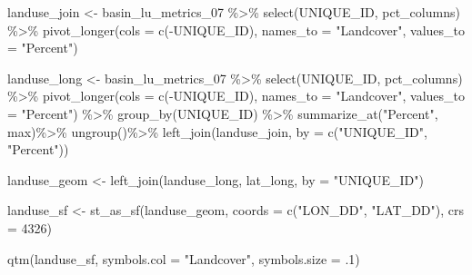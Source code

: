 \documentclass[
]{book}
\newenvironment{Shaded}{\begin{snugshade}}{\end{snugshade}}
\newcommand{\AttributeTok}[1]{\textcolor[rgb]{0.77,0.63,0.00}{#1}}
\newcommand{\DecValTok}[1]{\textcolor[rgb]{0.00,0.00,0.81}{#1}}
\newcommand{\FunctionTok}[1]{\textcolor[rgb]{0.00,0.00,0.00}{#1}}
\newcommand{\NormalTok}[1]{#1}
\newcommand{\OtherTok}[1]{\textcolor[rgb]{0.56,0.35,0.01}{#1}}
\newcommand{\SpecialCharTok}[1]{\textcolor[rgb]{0.00,0.00,0.00}{#1}}
\newcommand{\StringTok}[1]{\textcolor[rgb]{0.31,0.60,0.02}{#1}}
\begin{document}
\begin{Shaded}
\begin{Highlighting}[]
\NormalTok{landuse\_join }\OtherTok{\textless{}{-}}\NormalTok{ basin\_lu\_metrics\_07 }\SpecialCharTok{\%\textgreater{}\%}
  \FunctionTok{select}\NormalTok{(UNIQUE\_ID, pct\_columns) }\SpecialCharTok{\%\textgreater{}\%}
  \FunctionTok{pivot\_longer}\NormalTok{(}\AttributeTok{cols =} \FunctionTok{c}\NormalTok{(}\SpecialCharTok{{-}}\NormalTok{UNIQUE\_ID), }\AttributeTok{names\_to =} \StringTok{"Landcover"}\NormalTok{, }\AttributeTok{values\_to =} \StringTok{"Percent"}\NormalTok{)}



\NormalTok{landuse\_long }\OtherTok{\textless{}{-}}\NormalTok{ basin\_lu\_metrics\_07 }\SpecialCharTok{\%\textgreater{}\%}
  \FunctionTok{select}\NormalTok{(UNIQUE\_ID, pct\_columns) }\SpecialCharTok{\%\textgreater{}\%}
  \FunctionTok{pivot\_longer}\NormalTok{(}\AttributeTok{cols =} \FunctionTok{c}\NormalTok{(}\SpecialCharTok{{-}}\NormalTok{UNIQUE\_ID), }\AttributeTok{names\_to =} \StringTok{"Landcover"}\NormalTok{, }\AttributeTok{values\_to =} \StringTok{"Percent"}\NormalTok{) }\SpecialCharTok{\%\textgreater{}\%}
  \FunctionTok{group\_by}\NormalTok{(UNIQUE\_ID) }\SpecialCharTok{\%\textgreater{}\%}
  \FunctionTok{summarize\_at}\NormalTok{(}\StringTok{"Percent"}\NormalTok{, max)}\SpecialCharTok{\%\textgreater{}\%}
  \FunctionTok{ungroup}\NormalTok{()}\SpecialCharTok{\%\textgreater{}\%}
  \FunctionTok{left\_join}\NormalTok{(landuse\_join, }\AttributeTok{by =} \FunctionTok{c}\NormalTok{(}\StringTok{"UNIQUE\_ID"}\NormalTok{, }\StringTok{"Percent"}\NormalTok{))}

\NormalTok{landuse\_geom }\OtherTok{\textless{}{-}} \FunctionTok{left\_join}\NormalTok{(landuse\_long, lat\_long, }\AttributeTok{by =} \StringTok{"UNIQUE\_ID"}\NormalTok{)}

\NormalTok{landuse\_sf }\OtherTok{\textless{}{-}} \FunctionTok{st\_as\_sf}\NormalTok{(landuse\_geom, }\AttributeTok{coords =} \FunctionTok{c}\NormalTok{(}\StringTok{"LON\_DD"}\NormalTok{, }\StringTok{"LAT\_DD"}\NormalTok{), }\AttributeTok{crs =} \DecValTok{4326}\NormalTok{)}

\FunctionTok{qtm}\NormalTok{(landuse\_sf, }\AttributeTok{symbols.col =} \StringTok{"Landcover"}\NormalTok{, }\AttributeTok{symbols.size =}\NormalTok{ .}\DecValTok{1}\NormalTok{)}
\end{Highlighting}
\end{Shaded}
\end{document}
